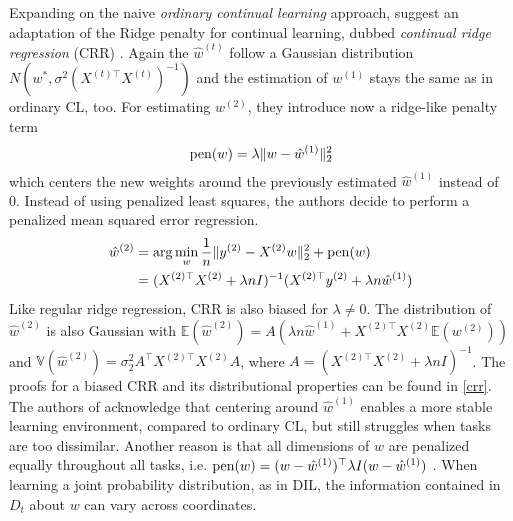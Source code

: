 Expanding on the naive \textit{ordinary continual learning} approach, \citeauthor{li2024fixeddesignanalysisregularizationbased} suggest an adaptation of the Ridge penalty \cite{Fahrmeir_2022} for continual learning, dubbed \textit{continual ridge regression} (CRR) \cite{li2024fixeddesignanalysisregularizationbased, zhao2024statisticaltheoryregularizationbasedcontinual}. Again the $\hat{w}^{(t)}$ follow a Gaussian distribution $N(w^*, \sigma^2(X^{(t)\top} X^{(t)})^{-1})$ and the estimation of $w^{(1)}$ stays the same as in ordinary CL, too. For estimating $w^{(2)}$, they introduce now a ridge-like penalty term
\begin{equation}
	\operatorname{pen}(w) = \lambda\lVert w - \hat{w}^{(1)}\rVert_2^2
\end{equation}
which centers the new weights around the previously estimated $\hat{w}^{(1)}$ instead of 0. Instead of using penalized least squares, the authors decide to perform a penalized mean squared error regression. %
\begin{equation}
	\begin{split}
		\hat{w}^{(2)} &= \arg\min_{w} \frac{1}{n}\lVert y^{(2)} - X^{(2)}w\rVert_2^2 + \operatorname{pen}(w) \\
		&= (X^{(2)\top} X^{(2)}+\lambda n I)^{-1}(X^{(2)\top} y^{(2)} +\lambda n \hat{w}^{(1)})
	\end{split}
\end{equation}
Like regular ridge regression, CRR is also biased for $\lambda \neq 0$. The distribution of $\hat{w}^{(2)}$ is also Gaussian with $\mathbb{E}(\hat{w}^{(2)}) = A(\lambda n \hat{w}^{(1)} + X^{(2)\top} X^{(2)}\mathbb{E}(w^{(2)}))$ and $\mathbb{V}(\hat{w}^{(2)}) = \sigma_2^2 A^\top X^{(2)\top} X^{(2)} A$, where $A =(X^{(2)\top} X^{(2)}+\lambda n I)^{-1}$. The proofs for a biased CRR and its distributional properties can be found in \autoref{crr}. The authors of \cite{li2024fixeddesignanalysisregularizationbased} acknowledge that centering around $\hat{w}^{(1)}$ enables a more stable learning environment, compared to ordinary CL, but still struggles when tasks are too dissimilar. Another reason is that all dimensions of $w$ are penalized equally throughout all tasks, i.e. $\operatorname{pen}(w) = (w - \hat{w}^{(1)})^\top \lambda I (w - \hat{w}^{(1)})$ . When learning a joint probability distribution, as in DIL, the information contained in $D_t$ about $w$ can vary across coordinates.
